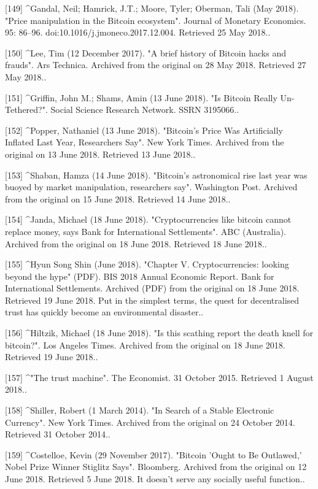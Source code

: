 [149]
^Gandal, Neil; Hamrick, J.T.; Moore, Tyler; Oberman, Tali (May 2018). "Price manipulation in the Bitcoin ecosystem". Journal of Monetary Economics. 95: 86–96. doi:10.1016/j.jmoneco.2017.12.004. Retrieved 25 May 2018..

[150]
^Lee, Tim (12 December 2017). "A brief history of Bitcoin hacks and frauds". Ars Technica. Archived from the original on 28 May 2018. Retrieved 27 May 2018..

[151]
^Griffin, John M.; Shams, Amin (13 June 2018). "Is Bitcoin Really Un-Tethered?". Social Science Research Network. SSRN 3195066..

[152]
^Popper, Nathaniel (13 June 2018). "Bitcoin's Price Was Artificially Inflated Last Year, Researchers Say". New York Times. Archived from the original on 13 June 2018. Retrieved 13 June 2018..

[153]
^Shaban, Hamza (14 June 2018). "Bitcoin's astronomical rise last year was buoyed by market manipulation, researchers say". Washington Post. Archived from the original on 15 June 2018. Retrieved 14 June 2018..

[154]
^Janda, Michael (18 June 2018). "Cryptocurrencies like bitcoin cannot replace money, says Bank for International Settlements". ABC (Australia). Archived from the original on 18 June 2018. Retrieved 18 June 2018..

[155]
^Hyun Song Shin (June 2018). "Chapter V. Cryptocurrencies: looking beyond the hype" (PDF). BIS 2018 Annual Economic Report. Bank for International Settlements. Archived (PDF) from the original on 18 June 2018. Retrieved 19 June 2018. Put in the simplest terms, the quest for decentralised trust has quickly become an environmental disaster..

[156]
^Hiltzik, Michael (18 June 2018). "Is this scathing report the death knell for bitcoin?". Los Angeles Times. Archived from the original on 18 June 2018. Retrieved 19 June 2018..

[157]
^"The trust machine". The Economist. 31 October 2015. Retrieved 1 August 2018..

[158]
^Shiller, Robert (1 March 2014). "In Search of a Stable Electronic Currency". New York Times. Archived from the original on 24 October 2014. Retrieved 31 October 2014..

[159]
^Costelloe, Kevin (29 November 2017). "Bitcoin 'Ought to Be Outlawed,' Nobel Prize Winner Stiglitz Says". Bloomberg. Archived from the original on 12 June 2018. Retrieved 5 June 2018. It doesn't serve any socially useful function..


